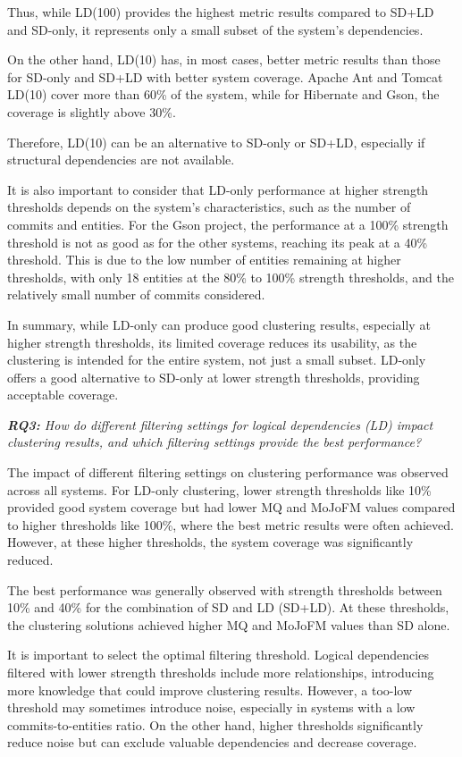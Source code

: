\documentclass{ieeeaccess}
\begin{document}
Thus, while LD(100) provides the highest metric results compared to SD+LD and SD-only, it represents only a small subset of the system's dependencies.

On the other hand, LD(10) has, in most cases, better metric results than those for SD-only and SD+LD with better system coverage. Apache Ant and Tomcat LD(10) cover more than 60\% of the system, while for Hibernate and Gson, the coverage is slightly above 30\%. 

Therefore, LD(10) can be an alternative to SD-only or SD+LD, especially if structural dependencies are not available.

It is also important to consider that LD-only performance at higher strength thresholds depends on the system's characteristics, such as the number of commits and entities. For the Gson project, the performance at a 100\% strength threshold is not as good as for the other systems, reaching its peak at a 40\% threshold. This is due to the low number of entities remaining at higher thresholds, with only 18 entities at the 80\% to 100\% strength thresholds, and the relatively small number of commits considered.

In summary, while LD-only can produce good clustering results, especially at higher strength thresholds, its limited coverage reduces its usability, as the clustering is intended for the entire system, not just a small subset. LD-only offers a good alternative to SD-only at lower strength thresholds, providing acceptable coverage.

\textit{ \textbf{RQ3:} How do different filtering settings for logical dependencies (LD) impact clustering results, and which filtering settings provide the best performance?}

The impact of different filtering settings on clustering performance was observed across all systems. For LD-only clustering, lower strength thresholds like 10\% provided good system coverage but had lower MQ and MoJoFM values compared to higher thresholds like 100\%, where the best metric results were often achieved. However, at these higher thresholds, the system coverage was significantly reduced.

The best performance was generally observed with strength thresholds between 10\% and 40\% for the combination of SD and LD (SD+LD). At these thresholds, the clustering solutions achieved higher MQ and MoJoFM values than SD alone.

It is important to select the optimal filtering threshold. Logical dependencies filtered with lower strength thresholds include more relationships, introducing more knowledge that could improve clustering results. However, a too-low threshold may sometimes introduce noise, especially in systems with a low commits-to-entities ratio. On the other hand, higher thresholds significantly reduce noise but can exclude valuable dependencies and decrease coverage.
\end{document}
